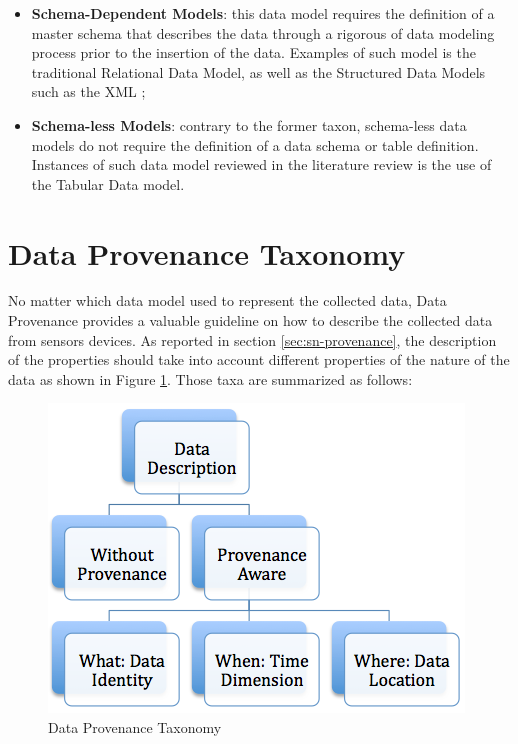 \begin{itemize}
  \item \textbf{Schema-Dependent Models}: this data model requires the
  definition of a master schema that describes the data through a rigorous of 
  data modeling process prior to the insertion of the data. Examples of such
  model is the traditional Relational Data Model\cite{relational-model}, as
 well as the Structured Data Models such as the XML \cite{xml};
  \item \textbf{Schema-less Models}: contrary to the former taxon, schema-less
  data models do not require the definition of a data schema or table
  definition. Instances of such data model reviewed in the literature review
  is the use of the Tabular Data model.
\end{itemize}

\section{Data Provenance Taxonomy}

No matter which data model used to represent the collected data, Data
Provenance provides a valuable guideline on how to describe the collected data
from sensors devices. As reported in section \ref{sec:sn-provenance}, the
description of the properties should take into account different properties of
the nature of the data as shown in Figure \ref{fig:taxonomy-data-provenance}.
Those taxa are summarized as follows:

\begin{figure}[h]
  \centering
  \includegraphics{../diagrams/taxonomy-data-provenance}
  \caption{Data Provenance Taxonomy}
  \label{fig:taxonomy-data-provenance}
\end{figure}

